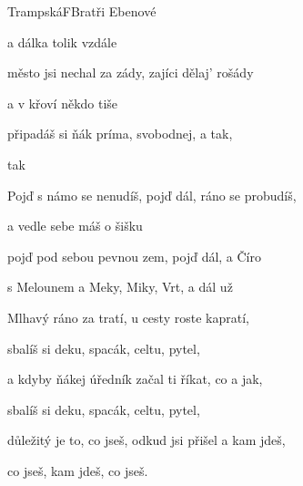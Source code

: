 \begin{song}{Trampská}{F}{Bratři Ebenové}

\begin{SBVerse}


a dálka tolik vzdále

město jsi nechal za zády, zajíci dělaj' rošády

a v křoví někdo tiše 

 připadáš si ňák príma, svobodnej, a tak,

tak 

\end{SBVerse}

\begin{SBChorus}

Pojď  s námo se nenudíš, pojď dál, ráno se probudíš,

a vedle sebe máš o šišku 

pojď  pod sebou pevnou zem, pojď dál, a Číro 

s Melounem a Meky, Miky, Vrt, a dál už 

\end{SBChorus}

\begin{SBVerse}

Mlhavý ráno za tratí, u cesty roste kapratí,

sbalíš si deku, spacák, celtu, pytel,

a kdyby ňákej úředník začal ti říkat, co a jak,

sbalíš si deku, spacák, celtu, pytel,

důležitý je to, co jseš, odkud jsi přišel a kam jdeš,

co jseš, kam jdeš, co jseš.

\end{SBVerse}

\end{song}

\pagebreak
